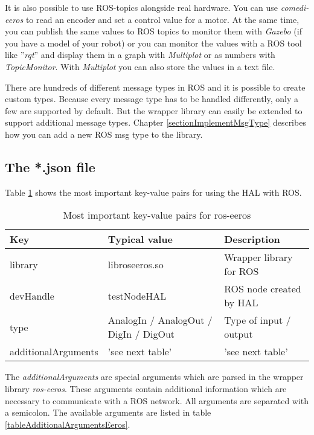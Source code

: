 It is also possible to use ROS-topics alongside real hardware.
You can use \textit{comedi-eeros} to read an encoder and set a control value for a motor.
At the same time, you can publish the same values to ROS topics to monitor them with \textit{Gazebo} (if you have a model of your robot) or you can monitor the values with a ROS tool like ''\textit{rqt}'' and display them in a graph with \textit{Multiplot} or as numbers with \textit{TopicMonitor}.
With \textit{Multiplot} you can also store the values in a text file.

There are hundreds of different message types in ROS and it is possible to create custom types.
Because every message type has to be handled differently, only a few are supported by default.
But the wrapper library can easily be extended to support additional message types.
Chapter \ref{sectionImplementMsgType} describes how you can add a new ROS msg type to the library.


\subsection{The *.json file}
Table \ref{tableKeyValueEeros} shows the most important key-value pairs for using the HAL with ROS.

\begin{table}[]
\centering
\caption{Most important key-value pairs for ros-eeros}
\label{tableKeyValueEeros}
\begin{tabular}{@{}lll@{}}
\toprule
Key                 & Typical value                         & Description              \\ \midrule
library             & libroseeros.so                        & Wrapper library  for ROS \\
devHandle           & testNodeHAL                           & ROS node created by HAL  \\
type                & AnalogIn / AnalogOut / DigIn / DigOut & Type of input / output   \\ 
additionalArguments & 'see next table'                      & 'see next table'         \\ \bottomrule
\end{tabular}
\end{table}

The \textit{additionalArguments} are special arguments which are parsed in the wrapper library \textit{ros-eeros}.
These arguments contain additional information which are necessary to communicate with a ROS network.
All arguments are separated with a semicolon.
The available arguments are listed in table \ref{tableAdditionalArgumentsEeros}.

